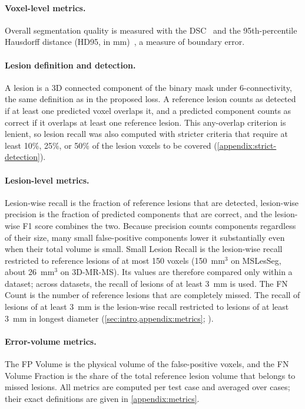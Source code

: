\paragraph{Voxel-level metrics.}
Overall segmentation quality is measured with the DSC~\cite{dice_measures_1945}
and the 95th-percentile Hausdorff distance (HD95, in
mm)~\cite{taha_metrics_2015}, a measure of boundary error.

\paragraph{Lesion definition and detection.}
A lesion is a 3D connected component of the binary mask under
6-connectivity, the same definition as in the proposed loss. A reference
lesion counts as detected if at least one predicted voxel overlaps it, and
a predicted component counts as correct if it overlaps at least one
reference lesion. This any-overlap criterion is lenient, so lesion recall
was also computed with stricter criteria that require at least 10\%, 25\%,
or 50\% of the lesion voxels to be covered
(\cref{appendix:strict-detection}).

\paragraph{Lesion-level metrics.}
Lesion-wise recall is the fraction of reference lesions that are detected,
lesion-wise precision is the fraction of predicted components that are
correct, and the lesion-wise F1 score combines the two. Because precision
counts components regardless of their size, many small false-positive
components lower it substantially even when their total volume is small.
Small Lesion Recall is the lesion-wise recall restricted to reference
lesions of at most 150 voxels (150~mm$^3$ on MSLesSeg, about 26~mm$^3$ on
3D-MR-MS). Its values are therefore compared only within a dataset; across
datasets, the recall of lesions of at least 3~mm is used. The FN
Count is the number of reference lesions that are completely missed. The
recall of lesions of at least 3~mm is the lesion-wise recall restricted to
lesions of at least 3~mm in longest diameter
(\cref{sec:intro,appendix:metrics}; \cite{barkhof_2024_2025,filippi_mri_2016}).

\paragraph{Error-volume metrics.}
The FP Volume is the physical volume of the false-positive voxels, and the
FN Volume Fraction is the share of the total reference lesion volume that
belongs to missed lesions. All metrics are computed per test case and
averaged over cases; their exact definitions are given in
\cref{appendix:metrics}.

